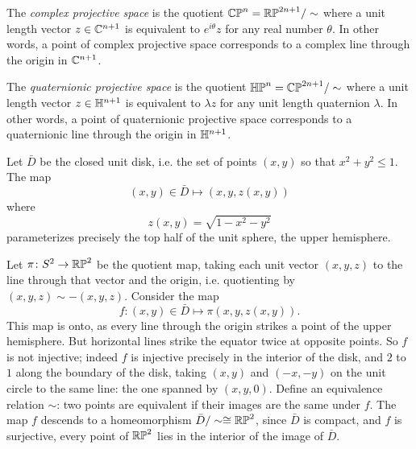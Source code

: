 \begin{example}
The \emph{complex projective space} is the quotient \(\mathbb{CP}^{n}=\mathbb{RP}^{2n+1}/\sim\) where a unit length vector \(z \in \mathbb{C}^{n+1}\) is equivalent to \(e^{i \theta} z\) for any real number \(\theta\).
In other words, a point of complex projective space corresponds to a complex line through the origin in \(\mathbb{C}^{n+1}\).
\end{example}
\begin{example}
The \emph{quaternionic projective space} is the quotient \(\mathbb{HP}^{n}=\mathbb{CP}^{2n+1}/\sim\) where a unit length vector \(z \in \mathbb{H}^{n+1}\) is equivalent to \(\lambda z\) for any unit length quaternion \(\lambda\).
In other words, a point of quaternionic projective space corresponds to a quaternionic line through the origin in \(\mathbb{H}^{n+1}\).
\end{example}
\begin{exampleAndImage}{2cm}
Let \(\bar{D}\) be the closed unit disk, i.e. the set of points \((x,y)\) so that \(x^2+y^2\le 1\).
The map
\[
(x,y)\in\bar{D}\mapsto(x,y,z(x,y))
\]
where
\[
z(x,y)=\sqrt{1-x^2-y^2}
\]
parameterizes precisely the top half of the unit sphere, the upper hemisphere.

Let \(\pi\colon S^2\to\mathbb{RP}^{2}\) be the quotient map, taking each unit vector \((x,y,z)\) to the line through that vector and the origin, i.e. quotienting by \((x,y,z)\sim-(x,y,z)\).
Consider the map
\[
f\colon(x,y)\in\bar{D}\mapsto\pi(x,y,z(x,y)).
\]
This map is onto, as every line through the origin strikes a point of the upper hemisphere.
But horizontal lines strike the equator twice at opposite points.
So \(f\) is not injective; indeed \(f\) is injective precisely in the interior of the disk, and \(2\) to \(1\) along the boundary of the disk, taking \((x,y)\) and \((-x,-y)\) on the unit circle to the same line: the one spanned by \((x,y,0)\).
Define an equivalence relation \(\sim\): two points are equivalent if their images are the same under \(f\).
The map \(f\) descends to a homeomorphism \(\bar{D}/\sim\cong\mathbb{RP}^{2}\), since \(\bar{D}\) is compact, and \(f\) is surjective, every point of \(\mathbb{RP}^{2}\) lies in the interior of the image of \(\bar{D}\).
\tcblower
\begin{tabular}{c}
\\[4cm]

\end{tabular}
\end{exampleAndImage}